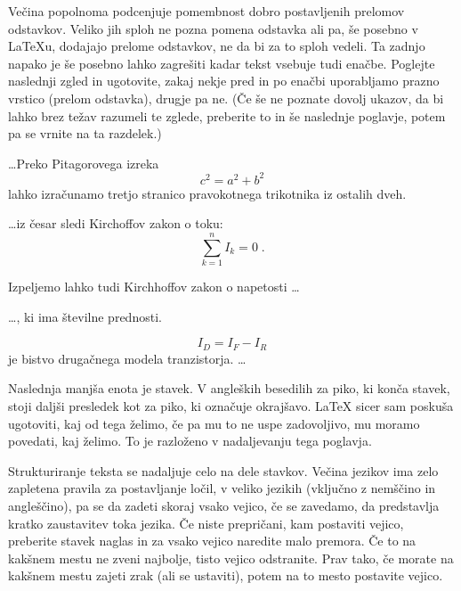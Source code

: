 Večina popolnoma podcenjuje pomembnost dobro postavljenih prelomov
odstavkov. Veliko jih sploh ne pozna pomena odstavka ali pa, še 
posebno v \LaTeX{}u, dodajajo prelome odstavkov, ne da bi za to sploh vedeli.
Ta zadnjo napako je še posebno lahko zagrešiti kadar tekst vsebuje tudi enačbe.
Poglejte naslednji zgled in ugotovite, zakaj nekje pred in po enačbi
uporabljamo prazno vrstico (prelom odstavka), drugje pa ne.  (Če še ne
poznate dovolj ukazov, da bi lahko brez težav razumeli te zglede, preberite to in še 
naslednje poglavje, potem pa se vrnite na ta razdelek.)
\begin{example}
\ldots Preko Pitagorovega izreka
\begin{equation} 
  c^2 = a^2+b^2 
\end{equation} 
lahko izračunamo tretjo 
stranico pravokotnega trikotnika 
iz ostalih dveh. 
\end{example}

\begin{example}
\ldots iz česar sledi Kirchoffov 
zakon o toku:
\begin{equation} 
  \sum_{k=1}^{n} I_k = 0 \; .
\end{equation} 

Izpeljemo lahko tudi Kirchhoffov 
zakon o napetosti \ldots
\end{example}

\begin{example}
\ldots, ki ima številne prednosti.

\begin{equation} 
  I_D = I_F - I_R
\end{equation} 
je bistvo drugačnega modela 
tranzistorja. \ldots
\end{example}

Naslednja manjša enota je stavek. V angleških besedilih za piko, ki konča stavek, stoji 
daljši presledek kot za piko, ki označuje okrajšavo. 
\LaTeX{} sicer sam poskuša ugotoviti, kaj od tega želimo,
če pa mu to ne uspe zadovoljivo, mu moramo povedati, kaj želimo. 
To je razloženo v nadaljevanju tega poglavja.

Strukturiranje teksta se nadaljuje celo na dele stavkov. Večina jezikov 
ima zelo zapletena pravila za postavljanje ločil, v veliko jezikih 
(vključno z nemščino in angleščino), pa se da zadeti skoraj vsako vejico, če se zavedamo,
da predstavlja kratko zaustavitev toka jezika. Če niste prepričani, kam
postaviti vejico, preberite stavek naglas in za vsako vejico naredite malo
premora. Če to na kakšnem mestu ne zveni najbolje, tisto vejico odstranite.
Prav tako, če morate na kakšnem mestu zajeti zrak (ali se ustaviti), potem
na to mesto postavite vejico.

